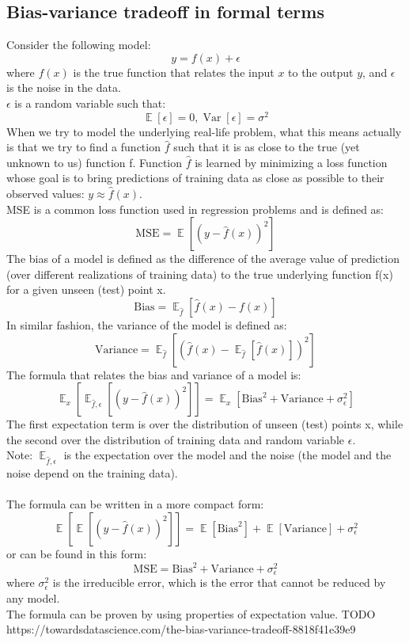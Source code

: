 \documentclass{article}
\DeclareMathOperator{\E}{\mathbb{E}}
\DeclareMathOperator{\Var}{Var}
\begin{document}
\subsection{Bias-variance tradeoff in formal terms}
Consider the following model:
\[y = f(x) + \epsilon\]
where $f(x)$ is the true function that relates the input $x$ to the output $y$, and $\epsilon$ is the noise in the data.\\
$\epsilon$ is a random variable such that:
\[\E[\epsilon] = 0, \Var[\epsilon] = \sigma^2\]
When we try to model the underlying real-life problem, what this means actually is that we try to find a function $\hat{f}$ such that it is as close to the true (yet unknown to us) function f.
Function $\hat{f}$ is learned by minimizing a loss function whose goal is to bring predictions of training data as close as possible to their observed values: $y \approx \hat{f}(x)$.\\
MSE is a common loss function used in regression problems and is defined as:
\[\text{MSE} = \E[(y - \hat{f}(x))^2]\]
The bias of a model is defined as the difference of the average value of prediction (over different realizations of training data) to the true underlying function f(x) for a given unseen (test) point x.
\[\text{Bias} = \E_{\hat{f}}[\hat{f}(x) - f(x)]\]
In similar fashion, the variance of the model is defined as:
\[\text{Variance} = \E_{\hat{f}}[(\hat{f}(x) - \E_{\hat{f}}[\hat{f}(x)])^2]\]
The formula that relates the bias and variance of a model is:
\[\E_x[\E_{\hat{f}, \epsilon}[(y - \hat{f}(x))^2]] = \E_x[\text{Bias}^2 + \text{Variance} + \sigma_\epsilon^2]\]
The first expectation term is over the distribution of unseen (test) points x, while the second over the distribution of training data and random variable $\epsilon$.\\
Note: $\E_{\hat{f}, \epsilon}$ is the expectation over the model and the noise (the model and the noise depend on the training data).\\\\
The formula can be written in a more compact form:
\[\E[\E[(y - \hat{f}(x))^2]] = \E[\text{Bias}^2] + \E[\text{Variance}] + \sigma_\epsilon^2\]
or can be found in this form:
\[\text{MSE} = \text{Bias}^2 + \text{Variance} + \sigma_\epsilon^2\]
where $\sigma_\epsilon^2$ is the irreducible error, which is the error that cannot be reduced by any model.\\
The formula can be proven by using properties of expectation value. TODO\\
https://towardsdatascience.com/the-bias-variance-tradeoff-8818f41e39e9
\end{document}
